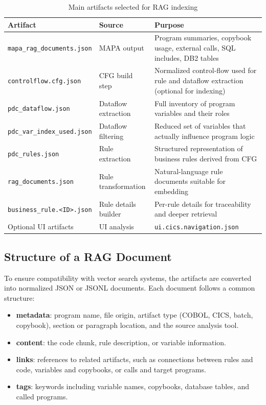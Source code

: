 \documentclass[11pt]{article}
\begin{document}
\begin{table}[h]
\centering
\begin{tabular}{|l|l|p{7cm}|}
\hline
\textbf{Artifact} & \textbf{Source} & \textbf{Purpose} \\
\hline
\texttt{mapa\_rag\_documents.json} & MAPA output & Program summaries, copybook usage, external calls, SQL includes, DB2 tables \\
\hline
\texttt{controlflow.cfg.json} & CFG build step & Normalized control-flow used for rule and dataflow extraction (optional for indexing) \\
\hline
\texttt{pdc\_dataflow.json} & Dataflow extraction & Full inventory of program variables and their roles \\
\hline
\texttt{pdc\_var\_index\_used.json} & Dataflow filtering & Reduced set of variables that actually influence program logic \\
\hline
\texttt{pdc\_rules.json} & Rule extraction & Structured representation of business rules derived from CFG \\
\hline
\texttt{rag\_documents.json} & Rule transformation & Natural-language rule documents suitable for embedding \\
\hline
\texttt{business\_rule.<ID>.json} & Rule details builder & Per-rule details for traceability and deeper retrieval \\
\hline
Optional UI artifacts & UI analysis & \texttt{ui.cics.navigation.json} \\
\hline
\end{tabular}
\caption{Main artifacts selected for RAG indexing}
\end{table}

\subsection*{Structure of a RAG Document}

To ensure compatibility with vector search systems, the artifacts are converted into normalized JSON or JSONL documents. Each document follows a common structure:

\begin{itemize}
\item \textbf{metadata}: program name, file origin, artifact type (COBOL, CICS, batch, copybook), section or paragraph location, and the source analysis tool.
\item \textbf{content}: the code chunk, rule description, or variable information.
\item \textbf{links}: references to related artifacts, such as connections between rules and code, variables and copybooks, or calls and target programs.
\item \textbf{tags}: keywords including variable names, copybooks, database tables, and called programs.
\end{itemize}
\end{document}
